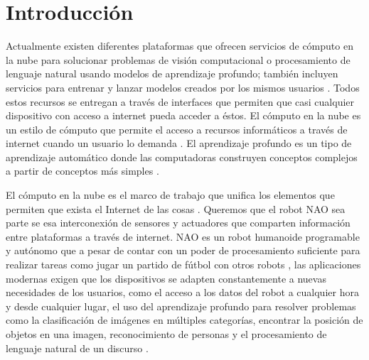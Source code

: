 

\chapter*{Introducción}
\label{\detokenize{introduction:cloudnao-una-arquitectura-de-software-para-la-integracion-de-computo-en-la-nube-con-robots-nao}}\label{\detokenize{introduction:introduccion}}\label{\detokenize{introduction::doc}}


Actualmente existen diferentes plataformas que 
ofrecen servicios
de cómputo en la nube para solucionar problemas de 
visión computacional \cite{googlevision2018} o
procesamiento de lenguaje natural \cite{witaidocs2018} usando modelos
de aprendizaje profundo; también incluyen servicios 
para entrenar y lanzar
modelos creados por los mismos usuarios \cite{tensorflowgooglecloud2018}.
Todos estos recursos se entregan a través de 
interfaces que
permiten que casi cualquier dispositivo con acceso a 
internet
pueda acceder a éstos.
El cómputo en la nube es un estilo de cómputo que 
permite el acceso a 
recursos informáticos a través de internet cuando un
usuario lo demanda \cite{borkofurhtarmandoescalante2010}. El aprendizaje profundo es un 
tipo
de aprendizaje automático donde las computadoras 
construyen
conceptos complejos a partir de conceptos más 
simples \cite{iangoodfellowyoshuabengioaaroncourville2017}.


El cómputo en la nube es el marco de trabajo que
unifica los elementos que permiten que exista el
Internet de las cosas \cite{jayavardhanagubbiarajkumarbuyyabslavenmarusicamarimuthupalaniswamia2013}. Queremos que el robot NAO 
sea parte se esa interconexión de sensores y actuadores
que comparten información entre plataformas
a través de internet.
NAO es un robot humanoide programable y autónomo
que a pesar de contar con
un poder de procesamiento suficiente para realizar 
tareas como
jugar un partido de fútbol con otros robots \cite{splinfo2018},
las aplicaciones modernas
exigen que los dispositivos se adapten constantemente a nuevas necesidades
de los usuarios, como el acceso a los datos
del robot a cualquier hora y desde cualquier lugar, el uso del aprendizaje profundo para resolver problemas como la 
clasificación de imágenes en múltiples categorías, encontrar
la posición de objetos en una imagen, reconocimiento
de personas y el 
procesamiento de lenguaje natural de un discurso \cite{benkehoesachinpatilpieterabbeelkengoldberg2014}.

